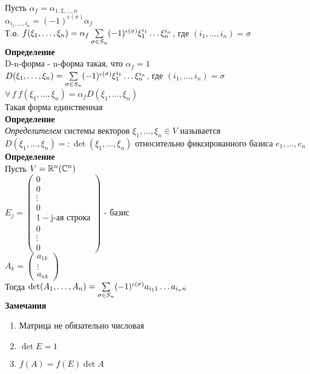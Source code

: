 \documentclass[12pt]{article}
\begin{document}
Пусть $\alpha_f = \alpha_{1,2,\ldots, n}$\\
$\alpha_{i_1, \ldots, i_n} = (-1)^{\epsilon(\sigma)}\alpha_f$\\
Т.о. $f(\xi_1, \ldots, \xi_n) = \alpha_f \sum\limits_{\sigma \in S_n} (-1)^{\epsilon(\sigma)} \xi_1^{i_1}\ldots\xi_n^{i_n}$, где $(i_1, \ldots, i_n) = \sigma$\\
\textbf{Определение}\\
D-n-форма - n-форма такая, что $\alpha_f = 1$\\
$D(\xi_1, \ldots, \xi_n) = \sum\limits_{\sigma \in S_n} (-1)^{\epsilon(\sigma)} \xi_1^{i_1}\ldots\xi_n^{i_n}$, где $(i_1, \ldots, i_n) = \sigma$\\
$\forall\,f\ f(\xi_1, \ldots, \xi_n) = \alpha_f D(\xi_1, \ldots, \xi_n)$\\
Такая форма единственная\\
\textbf{Определение}\\
\textit{Определителем} системы векторов $\xi_1, \ldots, \xi_n \in V$ называется $D(\xi_1, \ldots, \xi_n) =: \det (\xi_1, \ldots, \xi_n)$ относительно фиксированного базиса $e_1, \ldots, e_n$\\
\textbf{Определение}\\
Пусть $V = \mathbb{R}^n(\mathbb{C}^n)$\\
$E_j = \begin{pmatrix}0\\0\\\vdots\\0\\1 - \text{j-ая строка}\\0\\\vdots\\0\end{pmatrix}$ - базис\\
$A_k = \begin{pmatrix}a_{1k}\\\vdots\\a_{nk}\end{pmatrix}$\\
Тогда $\det (A_1, \ldots, A_n) = \sum\limits_{\sigma \in S_n} (-1)^{\epsilon(\sigma)}a_{i_11}\ldots a_{i_nn}$\\
\textbf{Замечания}
\begin{enumerate}
    \item Матрица не обязательно числовая
    \item $\det E = 1$
    \item $f(A) = f(E) \det A$
\end{enumerate}
\end{document}
